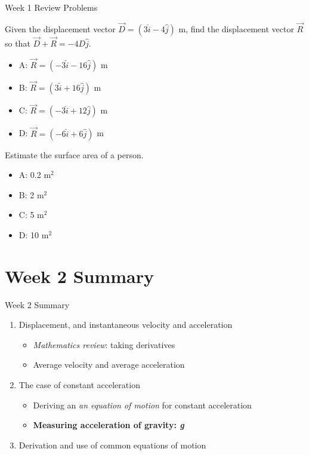 \documentclass{beamer}
\begin{document}
\begin{frame}{Week 1 Review Problems}
\small
\begin{minipage}[b]{0.45\linewidth}
Given the displacement vector $\vec{D} = (3\hat{i}-4\hat{j})$ m, find the displacement vector $\vec{R}$ so that $\vec{D} + \vec{R} = -4D\hat{j}$.
\begin{itemize}
\item A: $\vec{R} =  (-3\hat{i}-16\hat{j})$ m
\item B: $\vec{R} =  (3\hat{i}+16\hat{j})$ m
\item C: $\vec{R} =  (-3\hat{i}+12\hat{j})$ m
\item D: $\vec{R} =  (-6\hat{i}+6\hat{j})$ m
\end{itemize}
\end{minipage}
\hspace{0.5cm}
\begin{minipage}[b]{0.45\linewidth}
Estimate the surface area of a person.
\vspace{1cm}
\begin{itemize}
\item A: 0.2 m$^2$
\item B: 2 m$^2$
\item C: 5 m$^2$
\item D: 10 m$^2$
\end{itemize}
\end{minipage}
\end{frame}

\section{Week 2 Summary}

\begin{frame}{Week 2 Summary}
\begin{enumerate}
\item Displacement, and instantaneous velocity and acceleration
\begin{itemize}
\item \textit{Mathematics review}: taking derivatives
\item Average velocity and average acceleration
\end{itemize}
\item The case of constant acceleration
\begin{itemize}
\item Deriving an \textit{an equation of motion} for constant acceleration
\item \textbf{Measuring acceleration of gravity: \textit{g}}
\end{itemize}
\item Derivation and use of \alert{common equations of motion}
\end{enumerate}
\end{frame}
\end{document}

